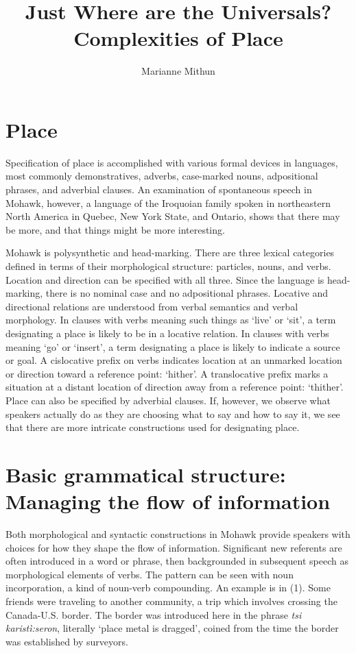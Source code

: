 \documentclass[output=paper,colorlinks,citecolor=brown
]{langscibook}
\author{Marianne Mithun\orcid{}\affiliation{University of California, Santa Barbara}}
\title{Just Where are the Universals?
Complexities of Place
}
\begin{document}
\maketitle


\section{Place}

Specification of place is accomplished with various formal devices in languages, most commonly demonstratives, adverbs, case-marked nouns, adpositional phrases, and adverbial clauses. An examination of spontaneous speech in Mohawk, however, a language of the Iroquoian family spoken in northeastern North America in Quebec, New York State, and Ontario, shows that there may be more, and that things might be more interesting.

Mohawk is polysynthetic and head-marking. There are three lexical categories defined in terms of their morphological structure: particles, nouns, and verbs. Location and direction can be specified with all three. Since the language is head-marking, there is no nominal case and no adpositional phrases. Locative and directional relations are understood from verbal semantics and verbal morphology. In clauses with verbs meaning such things as `live' or `sit', a term designating a place is likely to be in a locative relation. In clauses with verbs meaning `go' or `insert', a term designating a place is likely to indicate a source or goal. A cislocative prefix on verbs indicates location at an unmarked location or direction toward a reference point: `hither'. A translocative prefix marks a situation at a distant location of direction away from a reference point: `thither'. Place can also be specified by adverbial clauses. If, however, we observe what speakers actually do as they are choosing what to say and how to say it, we see that there are more intricate constructions used for designating place. 
\section{Basic grammatical structure: Managing the flow of information}
 Both morphological and syntactic constructions in Mohawk provide speakers with choices for how they shape the flow of information. Significant new referents are often introduced in a word or phrase, then backgrounded in subsequent speech as morphological elements of verbs. The pattern can be seen with noun incorporation, a kind of noun-verb compounding. An example is in (1). Some friends were traveling to another community, a trip which involves crossing the Canada-U.S. border. The border was introduced here in the phrase \emph{tsi karistì:seron}, literally `place metal is dragged', coined from the time the border was established by surveyors. \vspace{5mm}
\end{document}
